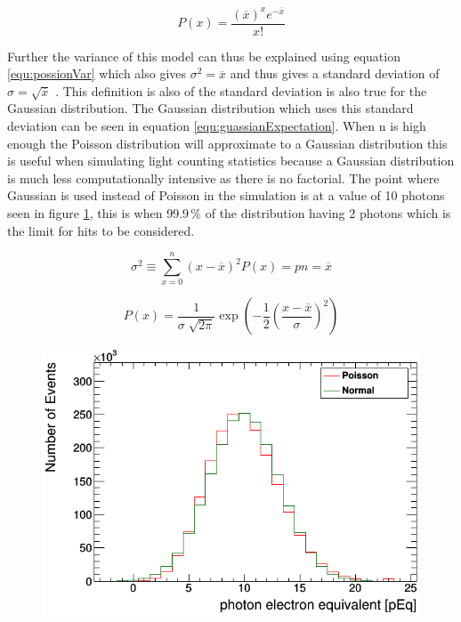 \begin{equation}
P(x) = \frac{(\overline{x})^x e^{-\overline{x}}}{x!}  
\label{equ:possionExpectation}
\end{equation}

Further the variance of this model can thus be explained using equation  \ref{equ:possionVar} which also gives $\sigma^2 = \overline{x}$ and thus gives a standard deviation of $\sigma = \sqrt{\overline{x}}$ \cite{knoll_2010}. This definition is also of the standard deviation is also true for the Gaussian distribution. The Gaussian distribution which uses this standard deviation can be seen in equation \ref{equ:guassianExpectation}. When n is high enough the Poisson distribution will approximate to a Gaussian distribution this is useful when simulating light counting statistics because a Gaussian distribution is much less computationally intensive as there is no factorial. The point where Gaussian is used instead of Poisson in the simulation is at a value of 10 photons seen in figure \ref{fig:CoutingStats10}, this is when 99.9\,\% of the distribution having 2 photons which is the limit for hits to be considered. 

\begin{equation}
\sigma ^2 \equiv \sum_{x=0}^{n} (x-\overline{x})^2 P(x) = pn = \overline{x} 
\label{equ:possionVar}
\end{equation}

\begin{equation}
P(x) = \frac{1}{\sigma \sqrt[]{2 \pi}} \exp \left(-\frac{1}{2}\left(\frac{x-\overline{x}}{\sigma}\right)^{2}\right)
\label{equ:guassianExpectation}
\end{equation}

\begin{figure}[H]
 \centering
 \includegraphics[width=0.8\linewidth]{countingStats10.png}
 \label{fig:CoutingStats10}
\end{figure}

